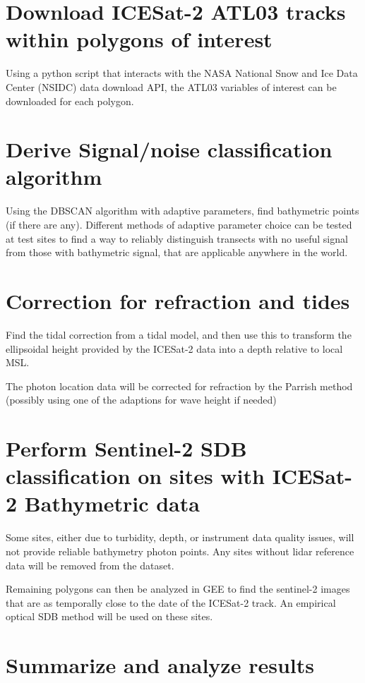 \section{Download ICESat-2 ATL03 tracks within polygons of interest}
Using a python script that interacts with the NASA National Snow and Ice Data Center (NSIDC) data download API, the ATL03 variables of interest can be downloaded for each polygon. 

\section{Derive Signal/noise classification algorithm}
Using the DBSCAN algorithm with adaptive parameters, find bathymetric points (if there are any). Different methods of adaptive parameter choice can be tested at test sites to find a way to reliably distinguish transects with no useful signal from those with bathymetric signal, that are applicable anywhere in the world.

\section{Correction for refraction and tides}
Find the tidal correction from a tidal model, and then use this to transform the ellipsoidal height provided by the ICESat-2 data into a depth relative to local MSL.

The photon location data will be corrected for refraction by the Parrish method (possibly using one of the adaptions for wave height if needed)

\section{Perform Sentinel-2 SDB classification on sites with ICESat-2 Bathymetric data}
Some sites, either due to turbidity, depth, or instrument data quality issues, will not provide reliable bathymetry photon points. Any sites without lidar reference data will be removed from the dataset. 

Remaining polygons can then be analyzed in GEE to find the sentinel-2 images that are as temporally close to the date of the ICESat-2 track. An empirical optical SDB method will be used on these sites. 

\section{Summarize and analyze results}


